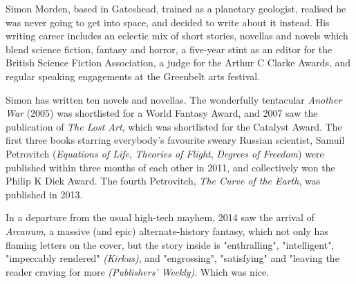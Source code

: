 Simon Morden, based in Gateshead, trained as a planetary geologist, realised he was never going to get into space, and decided to write about it instead. His writing career includes an eclectic mix of short stories, novellas and novels which blend science fiction, fantasy and horror, a five-year stint as an editor for the British Science Fiction Association, a judge for the Arthur C Clarke Awards, and regular speaking engagements at the Greenbelt arts festival.

Simon has written ten novels and novellas. The wonderfully tentacular \emph{Another War} (2005) was shortlisted for a World Fantasy Award, and 2007 saw the publication of \emph{The Lost Art}, which was shortlisted for the Catalyst Award. The first three books starring everybody's favourite sweary Russian scientist, Samuil Petrovitch (\emph{Equations of Life}, \emph{Theories of Flight}, \emph{Degrees of Freedom}) were published within three months of each other in 2011, and collectively won the Philip K Dick Award. The fourth Petrovitch, \emph{The Curve of the Earth}, was published in 2013.

In a departure from the usual high-tech mayhem, 2014 saw the arrival of \emph{Arcanum}, a massive (and epic) alternate-history fantasy, which not only has flaming letters on the cover, but the story inside is "enthralling", "intelligent", "impeccably rendered" \emph{(Kirkus)}, and "engrossing", "satisfying" and "leaving the reader craving for more \emph{(Publishers' Weekly)}. Which was nice.

